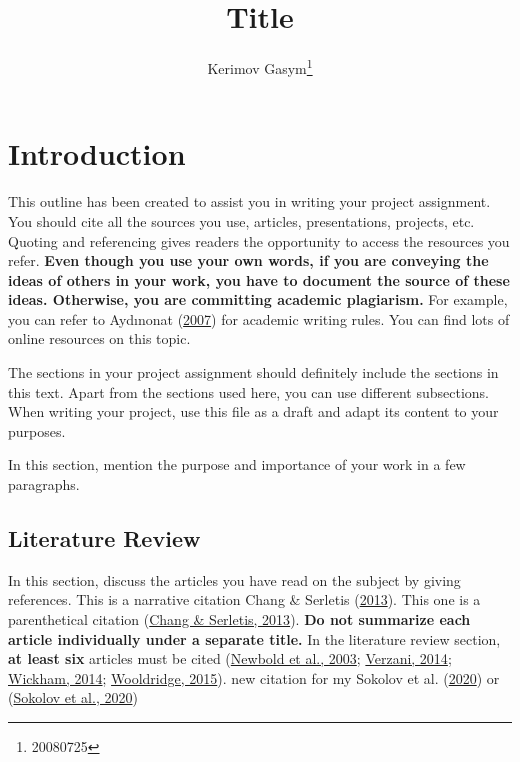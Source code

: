 \documentclass[
  12pt,
]{article}
\title{Title}
\author{Kerimov Gasym\footnote{20080725}}
\date{}
\begin{document}
\maketitle

\hypertarget{introduction}{%
\section{Introduction}\label{introduction}}

This outline has been created to assist you in writing your project assignment. You should cite all the sources you use, articles, presentations, projects, etc. Quoting and referencing gives readers the opportunity to access the resources you refer. \textbf{Even though you use your own words, if you are conveying the ideas of others in your work, you have to document the source of these ideas. Otherwise, you are committing academic plagiarism.} For example, you can refer to Aydınonat (\protect\hyperlink{ref-aydinonat:2007}{2007}) for academic writing rules. You can find lots of online resources on this topic.

The sections in your project assignment should definitely include the sections in this text. Apart from the sections used here, you can use different subsections. When writing your project, use this file as a draft and adapt its content to your purposes.

In this section, mention the purpose and importance of your work in a few paragraphs.

\hypertarget{literature-review}{%
\subsection{Literature Review}\label{literature-review}}

In this section, discuss the articles you have read on the subject by giving references. This is a narrative citation Chang \& Serletis (\protect\hyperlink{ref-chang:2013}{2013}). This one is a parenthetical citation (\protect\hyperlink{ref-chang:2013}{Chang \& Serletis, 2013}). \textbf{Do not summarize each article individually under a separate title.} In the literature review section, \textbf{at least six} articles must be cited (\protect\hyperlink{ref-newbold:2003}{Newbold et al., 2003}; \protect\hyperlink{ref-verzani:2014}{Verzani, 2014}; \protect\hyperlink{ref-wickham:2014}{Wickham, 2014}; \protect\hyperlink{ref-wooldridge:2015a}{Wooldridge, 2015}).
new citation for my Sokolov et al. (\protect\hyperlink{ref-sokolov2020complex}{2020}) or (\protect\hyperlink{ref-sokolov2020complex}{Sokolov et al., 2020})
\end{document}
